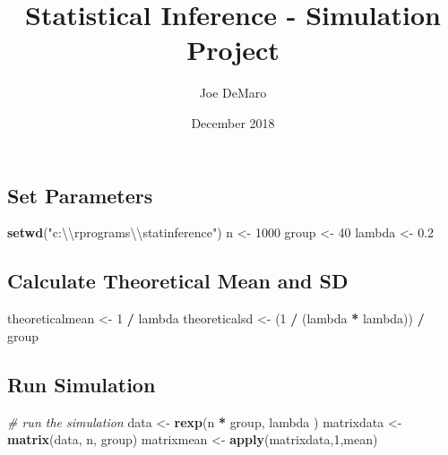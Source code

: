 \documentclass[]{article}
\title{Statistical Inference - Simulation Project}
\author{Joe DeMaro}
\date{December 2018}
\newenvironment{Shaded}{\begin{snugshade}}{\end{snugshade}}
\newcommand{\KeywordTok}[1]{\textcolor[rgb]{0.13,0.29,0.53}{\textbf{#1}}}
\newcommand{\DecValTok}[1]{\textcolor[rgb]{0.00,0.00,0.81}{#1}}
\newcommand{\FloatTok}[1]{\textcolor[rgb]{0.00,0.00,0.81}{#1}}
\newcommand{\CharTok}[1]{\textcolor[rgb]{0.31,0.60,0.02}{#1}}
\newcommand{\StringTok}[1]{\textcolor[rgb]{0.31,0.60,0.02}{#1}}
\newcommand{\CommentTok}[1]{\textcolor[rgb]{0.56,0.35,0.01}{\textit{#1}}}
\newcommand{\OperatorTok}[1]{\textcolor[rgb]{0.81,0.36,0.00}{\textbf{#1}}}
\newcommand{\NormalTok}[1]{#1}
\begin{document}
\maketitle

\subsection{Set Parameters}\label{set-parameters}

\begin{Shaded}
\begin{Highlighting}[]
\KeywordTok{setwd}\NormalTok{(}\StringTok{"c:}\CharTok{\textbackslash{}\textbackslash{}}\StringTok{rprograms}\CharTok{\textbackslash{}\textbackslash{}}\StringTok{statinference"}\NormalTok{)}
\NormalTok{n <-}\StringTok{ }\DecValTok{1000}
\NormalTok{group <-}\StringTok{ }\DecValTok{40}
\NormalTok{lambda <-}\StringTok{ }\FloatTok{0.2}
\end{Highlighting}
\end{Shaded}

\subsection{Calculate Theoretical Mean and
SD}\label{calculate-theoretical-mean-and-sd}

\begin{Shaded}
\begin{Highlighting}[]
\NormalTok{theoreticalmean <-}\StringTok{ }\DecValTok{1} \OperatorTok{/}\StringTok{ }\NormalTok{lambda}
\NormalTok{theoreticalsd <-}\StringTok{ }\NormalTok{(}\DecValTok{1} \OperatorTok{/}\StringTok{ }\NormalTok{(lambda }\OperatorTok{*}\StringTok{ }\NormalTok{lambda)) }\OperatorTok{/}\StringTok{ }\NormalTok{group}
\end{Highlighting}
\end{Shaded}

\subsection{Run Simulation}\label{run-simulation}

\begin{Shaded}
\begin{Highlighting}[]
\CommentTok{# run the simulation}
\NormalTok{data  <-}\StringTok{ }\KeywordTok{rexp}\NormalTok{(n }\OperatorTok{*}\StringTok{ }\NormalTok{group, lambda )}
\NormalTok{matrixdata <-}\StringTok{ }\KeywordTok{matrix}\NormalTok{(data, n, group)}
\NormalTok{matrixmean <-}\StringTok{ }\KeywordTok{apply}\NormalTok{(matrixdata,}\DecValTok{1}\NormalTok{,mean)}
\end{Highlighting}
\end{Shaded}
\end{document}

